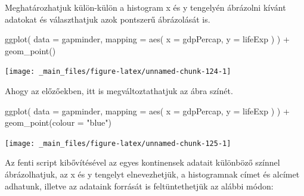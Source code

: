 \documentclass[
]{book}
\newenvironment{Shaded}{\begin{snugshade}}{\end{snugshade}}
\newcommand{\AttributeTok}[1]{\textcolor[rgb]{0.77,0.63,0.00}{#1}}
\newcommand{\FunctionTok}[1]{\textcolor[rgb]{0.00,0.00,0.00}{#1}}
\newcommand{\NormalTok}[1]{#1}
\newcommand{\SpecialCharTok}[1]{\textcolor[rgb]{0.00,0.00,0.00}{#1}}
\newcommand{\StringTok}[1]{\textcolor[rgb]{0.31,0.60,0.02}{#1}}
\begin{document}
Meghatározhatjuk külön-külön a histogram x és y tengelyén ábrázolni
kívánt adatokat és választhatjuk azok pontszerű ábrázolását is.

\begin{Shaded}
\begin{Highlighting}[]
\FunctionTok{ggplot}\NormalTok{(}
  \AttributeTok{data =}\NormalTok{ gapminder,}
  \AttributeTok{mapping =} \FunctionTok{aes}\NormalTok{(}
    \AttributeTok{x =}\NormalTok{ gdpPercap,}
    \AttributeTok{y =}\NormalTok{ lifeExp}
\NormalTok{  )}
\NormalTok{) }\SpecialCharTok{+}
  \FunctionTok{geom\_point}\NormalTok{()}
\end{Highlighting}
\end{Shaded}

\begin{center}\texttt{[image: \_main\_files/figure-latex/unnamed-chunk-124-1]} \end{center}

Ahogy az előzőekben, itt is megváltoztathatjuk az ábra színét.

\begin{Shaded}
\begin{Highlighting}[]
\FunctionTok{ggplot}\NormalTok{(}
  \AttributeTok{data =}\NormalTok{ gapminder,}
  \AttributeTok{mapping =} \FunctionTok{aes}\NormalTok{(}
    \AttributeTok{x =}\NormalTok{ gdpPercap,}
    \AttributeTok{y =}\NormalTok{ lifeExp}
\NormalTok{  )}
\NormalTok{) }\SpecialCharTok{+}
  \FunctionTok{geom\_point}\NormalTok{(}\AttributeTok{colour =} \StringTok{"blue"}\NormalTok{)}
\end{Highlighting}
\end{Shaded}

\begin{center}\texttt{[image: \_main\_files/figure-latex/unnamed-chunk-125-1]} \end{center}

Az fenti script kibővítésével az egyes kontinensek adatait különböző
színnel ábrázolhatjuk, az x és y tengelyt elnevezhetjük, a histogramnak
címet és alcímet adhatunk, illetve az adataink forrását is
feltüntethetjük az alábbi módon:

\begin{Shaded}
\end{Shaded}
\end{document}
